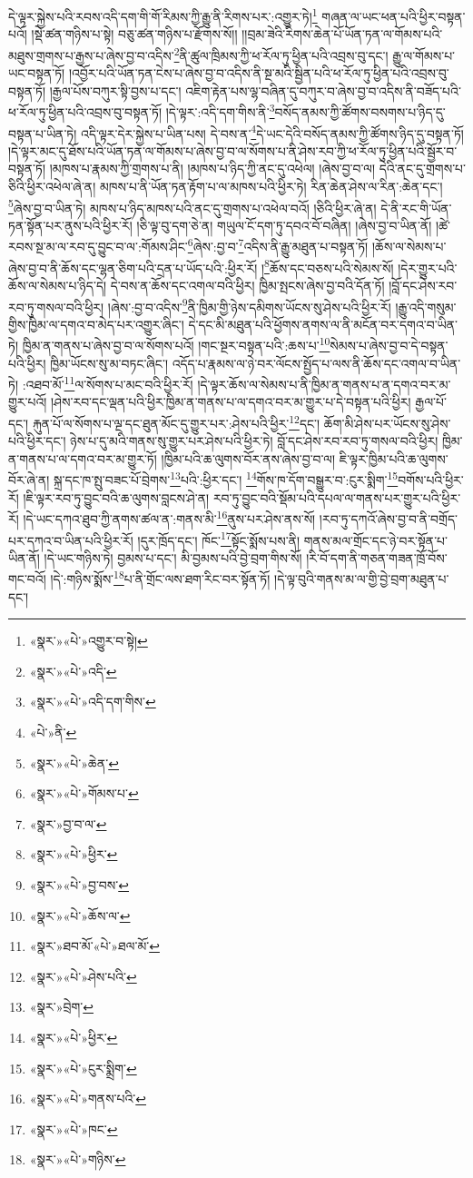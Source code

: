 དེ་ལྟར་སྐྱེས་པའི་རབས་འདི་དག་གི་གོ་རིམས་ཀྱི་རྒྱུ་ནི་རིགས་པར་:འགྱུར་ཏེ།\footnote{«སྣར་»«པེ་»འགྱུར་བ་སྟེ།} གཞན་ལ་ཡང་ཕན་པའི་ཕྱིར་བསྟན་པའོ། །སྡེ་ཚན་གཉིས་པ་སྟེ། བཅུ་ཚན་གཉིས་པ་རྫོགས་སོ།། །།བྲམ་ཟེའི་རིགས་ཆེན་པོ་ཡོན་ཏན་ལ་གོམས་པའི་མཐུས་གྲགས་པ་རྒྱས་པ་ཞེས་བྱ་བ་འདིས་\footnote{«སྣར་»«པེ་»འདི་}ནི་ཚུལ་ཁྲིམས་ཀྱི་ཕ་རོལ་ཏུ་ཕྱིན་པའི་འབྲས་བུ་དང་། རྒྱུ་ལ་གོམས་པ་ཡང་བསྟན་ཏོ། །འབྱོར་པའི་ཡོན་ཏན་ངེས་པ་ཞེས་བྱ་བ་འདིས་ནི་སྔ་མའི་སྦྱིན་པའི་ཕ་རོལ་ཏུ་ཕྱིན་པའི་འབྲས་བུ་བསྟན་ཏོ། །རྒྱལ་པོས་བཀུར་སྟི་བྱས་པ་དང་། འཇིག་རྟེན་པས་ལྷ་བཞིན་དུ་བཀུར་བ་ཞེས་བྱ་བ་འདིས་ནི་བཟོད་པའི་ཕ་རོལ་ཏུ་ཕྱིན་པའི་འབྲས་བུ་བསྟན་ཏོ། །དེ་ལྟར་:འདི་དག་གིས་ནི་\footnote{«སྣར་»«པེ་»འདི་དག་གིས་}བསོད་ནམས་ཀྱི་ཚོགས་བསགས་པ་ཉིད་དུ་བསྟན་པ་ཡིན་ཏེ། འདི་ལྟར་དེར་སྐྱེས་པ་ཡིན་པས། དེ་བས་ན་\footnote{«པེ་»ནི་}དེ་ཡང་དེའི་བསོད་ནམས་ཀྱི་ཚོགས་ཉིད་དུ་བསྟན་ཏོ། །དེ་ལྟར་མང་དུ་ཐོས་པའི་ཡོན་ཏན་ལ་གོམས་པ་ཞེས་བྱ་བ་ལ་སོགས་པ་ནི་ཤེས་རབ་ཀྱི་ཕ་རོལ་ཏུ་ཕྱིན་པའི་སྦྱོར་བ་བསྟན་ཏོ། །མཁས་པ་རྣམས་ཀྱི་གྲགས་པ་ནི། །མཁས་པ་ཉིད་ཀྱི་ནང་དུ་འཕེལ། །ཞེས་བྱ་བ་ལ། དེའི་ནང་དུ་གྲགས་པ་ཅིའི་ཕྱིར་འཕེལ་ཞེ་ན། མཁས་པ་ནི་ཡོན་ཏན་རྟོག་པ་ལ་མཁས་པའི་ཕྱིར་ཏེ། རིན་ཆེན་ཤེས་ལ་རིན་:ཆེན་དང་། \footnote{«སྣར་»«པེ་»ཆེན་}ཞེས་བྱ་བ་ཡིན་ཏེ། མཁས་པ་ཉིད་མཁས་པའི་ནང་དུ་གྲགས་པ་འཕེལ་བའོ། །ཅིའི་ཕྱིར་ཞེ་ན། དེ་ནི་རང་གི་ཡོན་ཏན་སྟོན་པར་ནུས་པའི་ཕྱིར་རོ། །ཅི་ལྟ་བུ་དག་ཅེ་ན། གཡུལ་ངོ་དག་ཏུ་དབའ་བོ་བཞིན། །ཞེས་བྱ་བ་ཡིན་ནོ། །ཚེ་རབས་སྔ་མ་ལ་རབ་དུ་བྱུང་བ་ལ་:གོམས་ཤིང་\footnote{«སྣར་»«པེ་»གོམས་པ་}ཞེས་:བྱ་བ་\footnote{«སྣར་»བྱ་བ་ལ་}འདིས་ནི་རྒྱུ་མཐུན་པ་བསྟན་ཏོ། །ཆོས་ལ་སེམས་པ་ཞེས་བྱ་བ་ནི་ཆོས་དང་ལྷན་ཅིག་པའི་དྲན་པ་ཡོད་པའི་:ཕྱིར་རོ། །\footnote{«སྣར་»«པེ་»ཕྱིར་}ཆོས་དང་བཅས་པའི་སེམས་སོ། །དེར་གྱུར་པའི་ཆོས་ལ་སེམས་པ་ཉིད་དེ། དེ་བས་ན་ཆོས་དང་འགལ་བའི་ཕྱིར། ཁྱིམ་སྤངས་ཞེས་བྱ་བའི་དོན་ཏོ། །བློ་དང་ཤེས་རབ་རབ་ཏུ་གསལ་བའི་ཕྱིར། །ཞེས་:བྱ་བ་འདིས་\footnote{«སྣར་»«པེ་»བྱ་བས་}ནི་ཁྱིམ་གྱི་ཉེས་དམིགས་ཡོངས་སུ་ཤེས་པའི་ཕྱིར་རོ། །རྒྱུ་འདི་གསུམ་གྱིས་ཁྱིམ་ལ་དགའ་བ་མེད་པར་འགྱུར་ཞིང་། དེ་དང་མི་མཐུན་པའི་ཕྱོགས་ནགས་ལ་ནི་མངོན་བར་དགའ་བ་ཡིན་ཏེ། ཁྱིམ་ན་གནས་པ་ཞེས་བྱ་བ་ལ་སོགས་པའོ། །གང་སྔར་བསྟན་པའི་:ཆས་པ་\footnote{«སྣར་»«པེ་»ཆོས་ལ་}སེམས་པ་ཞེས་བྱ་བ་དེ་བསྟན་པའི་ཕྱིར། ཁྱིམ་ཡོངས་སུ་མ་བཏང་ཞིང་། འདོད་པ་རྣམས་ལ་ཉེ་བར་ལོངས་སྤྱོད་པ་ལས་ནི་ཆོས་དང་འགལ་བ་ཡིན་ཏེ། :འཐབ་མོ་\footnote{«སྣར་»ཐབ་མོ་«པེ་»ཐལ་མོ་}ལ་སོགས་པ་མང་བའི་ཕྱིར་རོ། །དེ་ལྟར་ཆོས་ལ་སེམས་པ་ནི་ཁྱིམ་ན་གནས་པ་ན་དགའ་བར་མ་གྱུར་པའོ། །ཤེས་རབ་དང་ལྡན་པའི་ཕྱིར་ཁྱིམ་ན་གནས་པ་ལ་དགའ་བར་མ་གྱུར་པ་དེ་བསྟན་པའི་ཕྱིར། རྒྱལ་པོ་དང་། རྐུན་པོ་ལ་སོགས་པ་ལྔ་དང་ཐུན་མོང་དུ་གྱུར་པར་:ཤེས་པའི་ཕྱིར་\footnote{«སྣར་»«པེ་»ཤེས་པའི་}དང་། ཆོག་མི་ཤེས་པར་ཡོངས་སུ་ཤེས་པའི་ཕྱིར་དང་། ཉེས་པ་དུ་མའི་གནས་སུ་གྱུར་པར་ཤེས་པའི་ཕྱིར་ཏེ། བློ་དང་ཤེས་རབ་རབ་ཏུ་གསལ་བའི་ཕྱིར། ཁྱིམ་ན་གནས་པ་ལ་དགའ་བར་མ་གྱུར་ཏོ། །ཁྱིམ་པའི་ཆ་ལུགས་བོར་ནས་ཞེས་བྱ་བ་ལ། ཇི་ལྟར་ཁྱིམ་པའི་ཆ་ལུགས་བོར་ཞེ་ན། སྐྲ་དང་ཁ་སྤུ་བཟང་པོ་བྲེགས་\footnote{«སྣར་»བྲེག་}པའི་:ཕྱིར་དང་། \footnote{«སྣར་»«པེ་»ཕྱིར་}གོས་ཁ་དོག་བསྒྱུར་བ་:ངུར་སྨིག་\footnote{«སྣར་»«པེ་»ངུར་སྨྲིག་}བགོས་པའི་ཕྱིར་རོ། །ཇི་ལྟར་རབ་ཏུ་བྱུང་བའི་ཆ་ལུགས་བླངས་ཤེ་ན། རབ་ཏུ་བྱུང་བའི་སྡོམ་པའི་དཔལ་ལ་གནས་པར་གྱུར་པའི་ཕྱིར་རོ། །དེ་ཡང་དཀའ་ཐུབ་ཀྱི་ནགས་ཚལ་ན་:གནས་མི་\footnote{«སྣར་»«པེ་»གནས་པའི་}ནུས་པར་ཤེས་ནས་སོ། །རབ་ཏུ་དཀའོ་ཞེས་བྱ་བ་ནི་བགྲོད་པར་དཀའ་བ་ཡིན་པའི་ཕྱིར་རོ། །དུར་ཁྲོད་དང་། ཁོང་\footnote{«སྣར་»«པེ་»ཁང་}སྟོང་སྨོས་པས་ནི། གནས་མལ་གྲོང་དང་ཉེ་བར་སྟོན་པ་ཡིན་ནོ། །དེ་ཡང་གཉིས་ཏེ། བྱམས་པ་དང་། མི་བྱམས་པའི་བྱེ་བྲག་གིས་སོ། །རི་བོ་དག་ནི་གཅན་གཟན་ཁྲོ་བོས་གང་བའོ། །དེ་:གཉིས་སྨོས་\footnote{«སྣར་»«པེ་»གཉིས་}པ་ནི་གྲོང་ལས་ཐག་རིང་བར་སྟོན་ཏོ། །དེ་ལྟ་བུའི་གནས་མ་ལ་གྱི་བྱེ་བྲག་མཐུན་པ་དང་། 